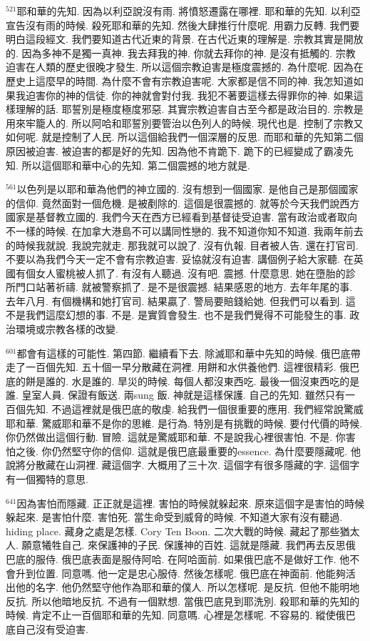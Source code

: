 \documentclass{book}
\begin{document}
$^{521}$耶和華的先知.
因為以利亞說沒有雨.
將憤怒遷露在哪裡.
耶和華的先知.
以利亞宣告沒有雨的時候.
殺死耶和華的先知.
然後大肆推行什麼呢.
用霸力反轉.
我們要明白這段經文.
我們要知道古代近東的背景.
在古代近東的理解是.
宗教其實是開放的.
因為多神不是獨一真神.
我去拜我的神.
你就去拜你的神.
是沒有抵觸的.
宗教迫害在人類的歷史很晚才發生.
所以這個宗教迫害是極度震撼的.
為什麼呢.
因為在歷史上這麼早的時間.
為什麼不會有宗教迫害呢.
大家都是信不同的神.
我怎知道如果我迫害你的神的信徒.
你的神就會對付我.
我犯不著要這樣去得罪你的神.
如果這樣理解的話.
耶誓別是極度極度邪惡.
其實宗教迫害自古至今都是政治目的.
宗教是用來牢籠人的.
所以阿哈和耶誓別要管治以色列人的時候.
現代也是.
控制了宗教又如何呢.
就是控制了人民.
所以這個給我們一個深層的反思.
而耶和華的先知第二個原因被迫害.
被迫害的都是好的先知.
因為他不肯跪下.
跪下的已經變成了霸凌先知.
所以這個耶和華中心的先知.
第二個震撼的地方就是.

$^{561}$以色列是以耶和華為他們的神立國的.
沒有想到一個國家.
是他自己是那個國家的信仰.
竟然面對一個危機.
是被剷除的.
這個是很震撼的.
就等於今天我們說西方國家是基督教立國的.
我們今天在西方已經看到基督徒受迫害.
當有政治或者取向不一樣的時候.
在加拿大港島不可以講同性戀的.
我不知道你知不知道.
我兩年前去的時候我就說.
我說完就走.
那我就可以說了.
沒有仇報.
目者被人告.
還在打官司.
不要以為我們今天一定不會有宗教迫害.
妥協就沒有迫害.
講個例子給大家聽.
在英國有個女人蜜桃被人抓了.
有沒有人聽過.
沒有吧.
震撼.
什麼意思.
她在墮胎的診所門口站著祈禱.
就被警察抓了.
是不是很震撼.
結果感恩的地方.
去年年尾的事.
去年八月.
有個機構和她打官司.
結果贏了.
警局要賠錢給她.
但我們可以看到.
這不是我們這麼幻想的事.
不是.
是實質會發生.
也不是我們覺得不可能發生的事.
政治環境或宗教各樣的改變.

$^{601}$都會有這樣的可能性.
第四節.
繼續看下去.
除滅耶和華中先知的時候.
俄巴底帶走了一百個先知.
五十個一早分散藏在洞裡.
用餅和水供養他們.
這裡很精彩.
俄巴底的餅是誰的.
水是誰的.
旱災的時候.
每個人都沒東西吃.
最後一個沒東西吃的是誰.
皇室人員.
保證有飯送.
兩sung 飯.
神就是這樣保護.
自己的先知.
雖然只有一百個先知.
不過這裡就是俄巴底的敬虔.
給我們一個很重要的應用.
我們經常說驚威耶和華.
驚威耶和華不是你的思維.
是行為.
特別是有挑戰的時候.
要付代價的時候.
你仍然做出這個行動.
冒險.
這就是驚威耶和華.
不是說我心裡很害怕.
不是.
你害怕之後.
你仍然堅守你的信仰.
這就是俄巴底最重要的essence.
為什麼要隱藏呢.
他說將分散藏在山洞裡.
藏這個字.
大概用了三十次.
這個字有很多隱藏的字.
這個字有一個獨特的意思.

$^{641}$因為害怕而隱藏.
正正就是這裡.
害怕的時候就躲起來.
原來這個字是害怕的時候躲起來.
是害怕什麼.
害怕死.
當生命受到威脅的時候.
不知道大家有沒有聽過.
hiding place.
藏身之處是怎樣.
Cory Ten Boon.
二次大戰的時候.
藏起了那些猶太人.
願意犧牲自己.
來保護神的子民.
保護神的百姓.
這就是隱藏.
我們再去反思俄巴底的服侍.
俄巴底表面是服侍阿哈.
在阿哈面前.
如果俄巴底不是做好工作.
他不會升到位置.
同意嗎.
他一定是忠心服侍.
然後怎樣呢.
俄巴底在神面前.
他能夠活出他的名字.
他仍然堅守他作為耶和華的僕人.
所以怎樣呢.
是反抗.
但他不能明地反抗.
所以他暗地反抗.
不過有一個默想.
當俄巴底見到耶洗別.
殺耶和華的先知的時候.
肯定不止一百個耶和華的先知.
同意嗎.
心裡是怎樣呢.
不容易的.
縱使俄巴底自己沒有受迫害.
\end{document}
